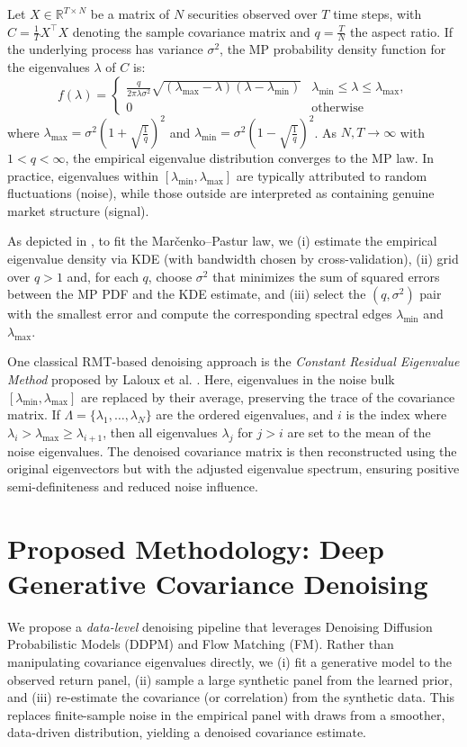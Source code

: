 \documentclass{article}
\begin{document}
Let \( X \in \mathbb{R}^{T \times N} \) be a matrix of \( N \) securities observed over \( T \) time steps, with $C = \frac{1}{T} X^\top X$ denoting the sample covariance matrix and \( q = \frac{T}{N} \) the aspect ratio. If the underlying process has variance \(\sigma^2\), the MP probability density function for the eigenvalues \(\lambda\) of \(C\) is:  
\[
f(\lambda) = 
\begin{cases}
\frac{q}{2\pi \lambda \sigma^2} \sqrt{(\lambda_{\text{max}} -\lambda)(\lambda - \lambda_{\text{min}})} & \lambda_{\text{min}} \leq \lambda \leq \lambda_{\text{max}}, \\
0 & \text{otherwise}
\end{cases}
\]
where   $\lambda_{\max} = \sigma^2\left( 1 + \sqrt{\frac{1}{q}} \right)^2$ and 
$\lambda_{\min} = \sigma^2\left( 1 - \sqrt{\frac{1}{q}} \right)^2$.
As \( N, T \to \infty \) with \( 1 < q < \infty \), the empirical eigenvalue distribution converges to the MP law. In practice, eigenvalues within \([ \lambda_{\min}, \lambda_{\max} ]\) are typically attributed to random fluctuations (noise), while those outside are interpreted as containing genuine market structure (signal).  


As depicted in  \cite{mlam2020}, to fit the Mar\v{c}enko--Pastur law, we (i) estimate the empirical eigenvalue density via KDE (with bandwidth chosen by cross-validation), (ii) grid over $q>1$ and, for each $q$, choose $\sigma^{2}$ that minimizes the sum of squared errors between the MP PDF and the KDE estimate, and (iii) select the $(q,\sigma^{2})$ pair with the smallest error and compute the corresponding spectral edges $\lambda_{\min}$ and $\lambda_{\max}$.


One classical RMT-based denoising approach is the \emph{Constant Residual Eigenvalue Method} proposed by Laloux et al. \cite{laloux2000}. Here, eigenvalues in the noise bulk \([ \lambda_{\min}, \lambda_{\max} ]\) are replaced by their average, preserving the trace of the covariance matrix. If \( \Lambda = \{\lambda_1, \dots, \lambda_N\} \) are the ordered eigenvalues, and \(i\) is the index where \(\lambda_i > \lambda_{\max} \ge \lambda_{i+1}\), then all eigenvalues \(\lambda_j\) for \( j > i \) are set to the mean of the noise eigenvalues. The denoised covariance matrix is then reconstructed using the original eigenvectors but with the adjusted eigenvalue spectrum, ensuring positive semi-definiteness and reduced noise influence.  


\section{Proposed Methodology: Deep Generative Covariance Denoising}\label{sec:dgm}
We propose a \emph{data-level} denoising pipeline that leverages Denoising Diffusion Probabilistic Models (DDPM) \cite{ho2020denoising} and Flow Matching (FM)\cite{lipman2023}. Rather than manipulating covariance eigenvalues directly, we (i) fit a generative model to the observed return panel, (ii) sample a large synthetic panel from the learned prior, and (iii) re-estimate the covariance (or correlation) from the synthetic data. This replaces finite-sample noise in the empirical panel with draws from a smoother, data-driven distribution, yielding a denoised covariance estimate.
\end{document}
